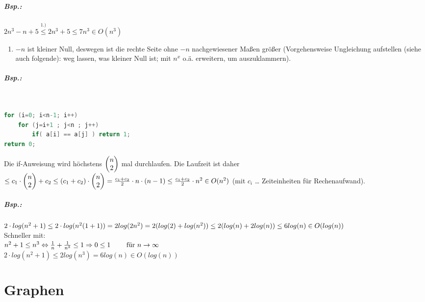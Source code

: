 \subparagraph{Bsp.:} $2n^3-n+5\overset{1.)}{\leq} 2n^3+5 \leq 7n^3 \in O(n^3)$
\begin{enumerate}
\item $-n$ ist kleiner Null, deswegen ist die rechte Seite ohne $-n$ nachgewiesener Maßen größer (Vorgehensweise Ungleichung aufstellen (siehe auch folgende): weg lassen, was kleiner Null ist; mit $n^x$ o.ä. erweitern, um auszuklammern).
\end{enumerate}

\subparagraph{Bsp.:}$ $
\begin{lstlisting}[language=C]
for (i=0; i<n-1; i++)
	for (j=i+1 ; j<n ; j++)
		if( a[i] == a[j] ) return 1;
return 0;
\end{lstlisting}
Die if-Anweisung wird höchstens $\begin{pmatrix}n\\2\end{pmatrix}$ mal durchlaufen. Die Laufzeit ist daher $\leq c_1 \cdot \begin{pmatrix}n\\2\end{pmatrix} + c_2 \leq (c_1+c_2) \cdot \begin{pmatrix}n\\2\end{pmatrix} = \frac{c_1+c_2}{2}\cdot n \cdot (n-1)\leq \frac{c_1 + c_2}{2}\cdot n^2 \in O(n^2)$ (mit $c_i$ … Zeiteinheiten für Rechenaufwand).
\subparagraph{Bsp.:} $2\cdot log(n^2+1)\\
\leq 2 \cdot log (n^2(1+1))\\
=2log(2n^2)=2(log(2)+log(n^2)) \\
\leq 2(log(n)+2log(n))\\
\leq 6 log(n) \in O(log(n))$\\
Schneller mit:\\
$n^2+1\leq n^3 \Leftrightarrow \\
\frac{1}{n}+\frac{1}{n^3}\leq 1 \Rightarrow \\
0\leq 1 \qquad \text{ für } n \rightarrow\infty$\\
$2\cdot log(n^2+1)\leq 2 log (n^3)=6log(n)\in O(log(n))$

\section{Graphen}

